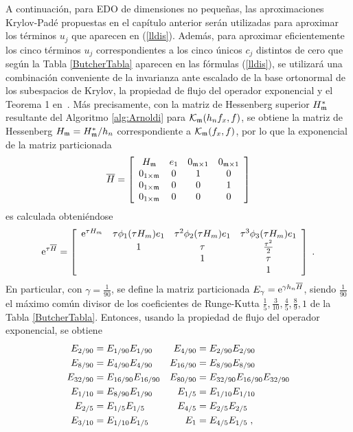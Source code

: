 A continuación, para EDO de dimensiones no pequeñas, las aproximaciones Krylov-Padé propuestas en el capítulo anterior serán utilizadas para aproximar los términos $u_j$ que aparecen en (\ref{lldis}). Además, para aproximar eficientemente los cinco términos $u_j$ correspondientes a los cinco únicos $c_j$ distintos de cero que según la Tabla \ref{ButcherTabla} aparecen en las fórmulas (\ref{lldis}), se utilizará una combinación conveniente de la invarianza ante escalado de la base ortonormal de los subespacios de Krylov, la propiedad de flujo del operador exponencial y el Teorema 1 en~\cite{sidje1998expokit}. Más precisamente, con la matriz de Hessenberg superior $H^*_{\mathfrak{m}}$ resultante del Algoritmo \ref{alg:Arnoldi} para $\mathcal{K}_{\mathfrak{m}}(h_nf_x,f)$, se obtiene la matriz de Hessenberg $H_{\mathfrak{m}}=H^*_{\mathfrak{m}}/h_n$ correspondiente a $\mathcal{K}_{\mathfrak{m}}(f_x,f)$, por lo que la exponencial de la matriz particionada
\begin{equation}
    \overline{H} = \left[\begin{array}{cccc}
    H_{\mathfrak{m}} & e_1 & 0_{\mathfrak{m}\times 1} & 0_{\mathfrak{m}\times 1}\\
    0_{1\times\mathfrak{m}} & 0 & 1 & 0\\
    0_{1\times\mathfrak{m}} & 0 & 0 & 1\\
    0_{1\times\mathfrak{m}} & 0 & 0 & 0
    \end{array}\right] \label{hhat}
\end{equation}
es calculada obteniéndose
\begin{equation}
    \mathrm{e}^{\tau\overline{H}} = \left[\begin{array}{cccc}
    \mathrm{e}^{\tau H_m} & \tau\phi_1(\tau H_m)e_1 & \tau^{2}\phi_2(\tau H_m)e_1 &
    \tau^{3}\phi_3(\tau H_m)e_1 \\
    & 1 & \tau & \frac{\tau^{2}}{2}\\
    &  & 1 & \tau \\
    &   &   & 1 \\
    \end{array}\right]\;. \label{phi_hhat}
\end{equation}
En particular, con $\gamma=\frac{1}{90}$, se define la matriz particionada $E_\gamma=\mathrm{e}^{\gamma h_n\overline{H}}$, siendo $\frac{1}{ 90}$ el máximo común divisor de los coeficientes de Runge-Kutta $\frac{1}{5},\frac{3}{10},\frac{4}{5},\frac{8}{9} ,1$ de la Tabla \ref{ButcherTabla}. Entonces, usando la propiedad de flujo del operador exponencial, se obtiene
\begin{align}
    E_{2/90}& =E_{1/90}E_{1/90} & E_{4/90}& =E_{2/90}E_{2/90}  \notag \\
    E_{8/90}& =E_{4/90}E_{4/90} & E_{16/90}& =E_{8/90}E_{8/90}  \notag \\
    E_{32/90}& =E_{16/90}E_{16/90} & E_{80/90}& =E_{32/90}E_{16/90}E_{32/90}
    \label{flow} \\
    E_{1/10}& =E_{8/90}E_{1/90} & E_{1/5}& =E_{1/10}E_{1/10}  \notag \\
    E_{2/5}& =E_{1/5}E_{1/5} & E_{4/5}& =E_{2/5}E_{2/5}  \notag \\
    E_{3/10}& =E_{1/10}E_{1/5} & E_{1}& =E_{4/5}E_{1/5}\;,  \notag
\end{align}
